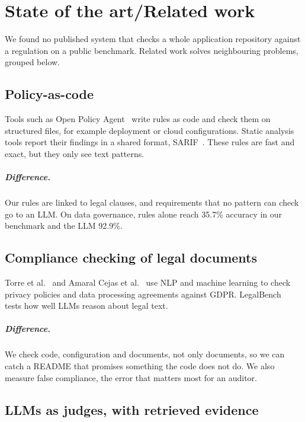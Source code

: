 \chapter{State of the art/Related work}
\label{chapter:related}

We found no published system that checks a whole application repository against a regulation on a public benchmark.
Related work solves neighbouring problems, grouped below.

\section{Policy-as-code}
\label{section:rel-pac}

Tools such as Open Policy Agent~\cite{opa} write rules as code and check them on structured files, for example
deployment or cloud configurations. Static analysis tools report their findings in a shared format,
SARIF~\cite{sarif2020}. These rules are fast and exact, but they only see text patterns.

\paragraph{Difference.} Our rules are linked to legal clauses, and requirements that no pattern can check go to an
LLM. On data governance, rules alone reach 35.7\% accuracy in our benchmark and the LLM 92.9\%.

\section{Compliance checking of legal documents}
\label{section:rel-nlp}

Torre et al.~\cite{torre2020completeness} and Amaral Cejas et al.~\cite{amaral2023dpa} use NLP and machine learning to check
privacy policies and data processing agreements against GDPR. LegalBench~\cite{guha2023legalbench} tests how well LLMs
reason about legal text.

\paragraph{Difference.} We check code, configuration and documents, not only documents, so we can catch a README that
promises something the code does not do. We also measure false compliance, the error that matters most for an auditor.

\section{LLMs as judges, with retrieved evidence}
\label{section:rel-llm}

